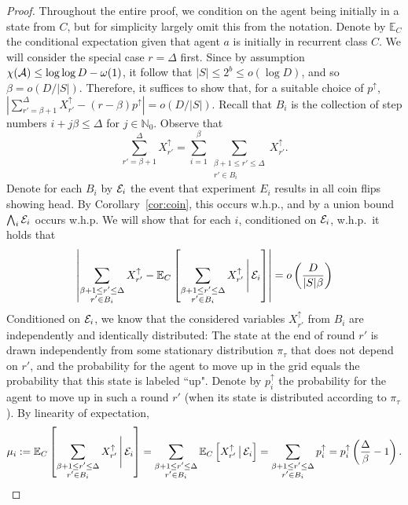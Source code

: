 \documentclass[11pt]{article}
\newcommand{\N}{\mathbb{N}}
\newcommand{\E}{\mathbb{E}}
\begin{document}
\begin{proof}
Throughout the entire proof, we condition on the agent being initially in a state from $C$, but for simplicity largely omit this from the notation. Denote by $\E_C$ the conditional expectation given that agent $a$ is initially in recurrent class $C$. We will consider the special case $r=\Delta$ first. Since by assumption $\chi({\cal A}) \leq \log \log D - \omega(1)$, it follow that $|S| \leq 2^b \leq o(\log D)$, and so $\beta=o(D/|S|)$.
Therefore, it suffices to show that, for a suitable choice of $p^{\uparrow}$, $\left|\sum_{r'=\beta+1}^{\Delta}X_{r'}^{\uparrow}-(r-\beta)p^{\uparrow}\right|=o(D/|S|)$. Recall that $B_i$ is the collection of step numbers $i + j \beta \leq \Delta$ for $j \in \N_0$. Observe that
	\begin{equation*}
	\sum_{r'=\beta+1}^{\Delta}X_{r'}^{\uparrow}=\sum_{i=1}^\beta\sum_{\substack{\beta+1\leq r'\leq \Delta\\ r'\in B_i}}X_{r'}^{\uparrow}.
	\end{equation*}
	Denote for each $B_i$ by ${\cal E}_i$ the event that experiment $E_i$ results in all coin flips showing head. By Corollary~\ref{cor:coin}, this occurs w.h.p., and by a union bound $\bigwedge_i {\cal E}_i$ occurs w.h.p. We will show that for each $i$, conditioned on ${\cal E}_i$, w.h.p.\ it holds that
	\begin{equation}\label{eq:condition}
	\left|\sum_{\substack{\beta+1\leq r'\leq \Delta\\ r'\in B_i}}X_{r'}^{\uparrow}
-\E_C\left[\sum_{\substack{\beta+1\leq r'\leq \Delta\\ r'\in B_i}}X_{r'}^{\uparrow}\,\Bigg|\,{\cal E}_i\right]\right|= o\left(\frac{D}{|S|\beta}\right)
	\end{equation}
	Conditioned on ${\cal E}_i$, we know that the considered variables $X_{r'}^{\uparrow}$ from $B_i$ are independently and identically distributed: The state at the end of round $r'$ is drawn independently from some stationary distribution $\pi_{\tau}$ that does not depend on $r'$, and the probability for the agent to move up in the grid equals the probability that this state is labeled ``up". Denote by $p_i^{\uparrow}$ the probability for the agent to move up in such a round $r'$ (when its state is distributed according to $\pi_{\tau}$). By linearity of expectation,
	\begin{equation*}
	\mu_i:=\E_C\left[\sum_{\substack{\beta+1\leq r'\leq \Delta\\ r'\in B_i}}X_{r'}^{\uparrow}\,\Bigg|\,{\cal E}_i\right]
	=\sum_{\substack{\beta+1\leq r'\leq \Delta\\ r'\in B_i}}\E_C\left[X_{r'}^{\uparrow}\,\big|\,{\cal E}_i\right]
	=\sum_{\substack{\beta+1\leq r'\leq \Delta\\ r'\in B_i}}p_i^{\uparrow}
	=p_i^{\uparrow} \left(\frac{\Delta}{\beta}-1\right).
	\end{equation*}
	

\end{proof}
\end{document}
